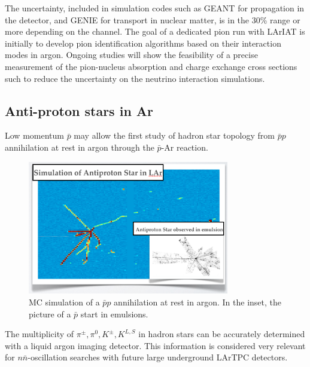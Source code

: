 \documentclass[DIV=calc, paper=a4, fontsize=10pt, twocolumn]{scrartcl}	 %
\begin{document}
{The uncertainty, included in simulation codes such as GEANT for propagation in the detector, and GENIE for transport in  nuclear matter, is in the 30\% range or more depending on the channel. The goal of a dedicated pion run with LArIAT is initially to develop pion identification algorithms based on their interaction modes in argon. Ongoing studies will show the feasibility of a precise measurement of the pion-nucleus absorption  and charge exchange cross sections such to reduce the uncertainty on the neutrino interaction simulations.

\subsection {Anti-proton stars in Ar}
\label{antip}

Low momentum $\bar p$ may allow the first study of hadron star topology from $\bar p p$ annihilation at rest in argon through the $\bar p$-Ar reaction. 
\begin{figure}[!h]
\begin{centering}
\includegraphics[height=2.3in]{Figures/anti-p-star}
\vspace{-0.5cm}
\caption{
{\scriptsize \sf MC simulation of a $\bar pp$ annihilation at rest in argon. In the inset, the picture of a  $\bar p$ start in emulsions. }
}
\label{fig:en-range-corr}
\end{centering}
\end{figure}
The multiplicity of $\pi^{\pm},\pi^0,K^{\pm},K^{L,S}$ in hadron stars can be accurately determined with a liquid argon imaging detector.  This information is considered very relevant for $n\bar{n}$-oscillation searches with future large underground LArTPC detectors.

}
\end{document}
